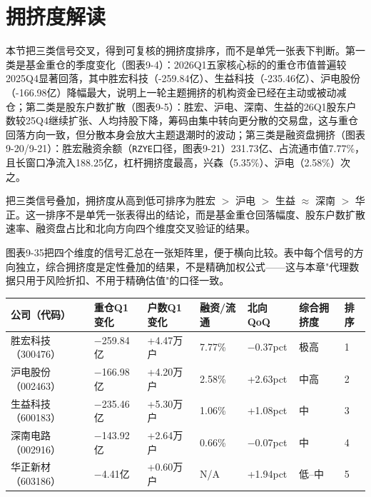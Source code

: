 \section{拥挤度解读}

本节把三类信号交叉，得到可复核的拥挤度排序，而不是单凭一张表下判断。第一类是基金重仓的季度变化（图表9-4）：2026Q1五家核心标的的重仓市值普遍较2025Q4显著回落，其中胜宏科技（-259.84亿）、生益科技（-235.46亿）、沪电股份（-166.98亿）降幅最大，说明上一轮主题拥挤的机构资金已经在主动或被动减仓；第二类是股东户数扩散（图表9-5）：胜宏、沪电、深南、生益的26Q1股东户数较25Q4继续扩张、人均持股下降，筹码由集中转向更分散的交易盘，这与重仓回落方向一致，但分散本身会放大主题退潮时的波动；第三类是融资盘拥挤（图表9-20/9-21）：胜宏融资余额（\texttt{RZYE}口径，图表9-21）231.73亿、占流通市值7.77\%，且长窗口净流入188.25亿，杠杆拥挤度最高，兴森（5.35\%）、沪电（2.58\%）次之。

把三类信号叠加，拥挤度从高到低可排序为胜宏 $>$ 沪电 $>$ 生益 $\approx$ 深南 $>$ 华正。这一排序不是单凭一张表得出的结论，而是基金重仓回落幅度、股东户数扩散速率、融资盘占比和北向方向四个维度交叉验证的结果。

图表9-35把四个维度的信号汇总在一张矩阵里，便于横向比较。表中每个信号的方向独立，综合拥挤度是定性叠加的结果，不是精确加权公式——这与本章"代理数据只用于风险折扣、不用于精确估值"的口径一致。

\begin{exhibitbox}
\small
\begin{tabularx}{\textwidth}{L{1.8cm}R{1.7cm}R{1.7cm}R{1.5cm}R{1.3cm}C{1.2cm}C{0.8cm}}
\toprule
\textbf{公司（代码）} & \textbf{重仓Q1变化} & \textbf{户数Q1变化} & \textbf{融资/流通} & \textbf{北向QoQ} & \textbf{综合拥挤度} & \textbf{排序} \\
\midrule
胜宏科技（300476） & $-$259.84亿 & +4.47万户 & 7.77\% & $-$0.37pct & 极高 & 1 \\
沪电股份（002463） & $-$166.98亿 & +4.20万户 & 2.58\% & +2.63pct & 中高 & 2 \\
生益科技（600183） & $-$235.46亿 & +5.30万户 & 1.06\% & +1.08pct & 中 & 3 \\
深南电路（002916） & $-$143.92亿 & +2.64万户 & 0.66\% & $-$0.07pct & 中 & 4 \\
华正新材（603186） & $-$4.41亿 & +0.60万户 & N/A & +1.94pct & 低--中 & 5 \\
\bottomrule
\end{tabularx}
\end{exhibitbox}

